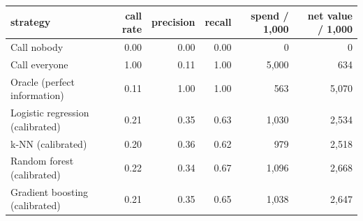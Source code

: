 \begin{tabular}{lrrrrr}
\toprule
strategy & call rate & precision & recall & spend / 1,000 & net value / 1,000 \\
\midrule
Call nobody & 0.00 & 0.00 & 0.00 & 0 & 0 \\
Call everyone & 1.00 & 0.11 & 1.00 & 5,000 & 634 \\
Oracle (perfect information) & 0.11 & 1.00 & 1.00 & 563 & 5,070 \\
Logistic regression (calibrated) & 0.21 & 0.35 & 0.63 & 1,030 & 2,534 \\
k-NN (calibrated) & 0.20 & 0.36 & 0.62 & 979 & 2,518 \\
Random forest (calibrated) & 0.22 & 0.34 & 0.67 & 1,096 & 2,668 \\
Gradient boosting (calibrated) & 0.21 & 0.35 & 0.65 & 1,038 & 2,647 \\
\bottomrule
\end{tabular}